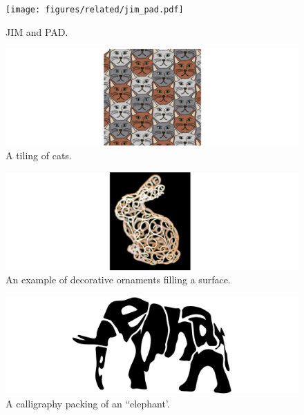 \begin{figure}[t]
\centering
\texttt{[image: figures/related/jim\_pad.pdf]} 
\caption[Examples of packings generated by JIM and PAD]
{\label{fig_related_jim_pad} 
JIM and PAD. }
\end{figure}

\begin{figure}[t]
\centering
\includegraphics[width=1.0\textwidth]{figures/related/escherization.pdf} 
\caption[An example of a tiling]
{\label{fig_related_escherization} 
A tiling of cats. }
\end{figure}

\begin{figure}[t]
\centering
\includegraphics[width=1.0\textwidth]{figures/related/zehnder.pdf} 
\caption[An example of decorative ornaments filling a surface]
{\label{fig_related_zehnder} 
An example of decorative ornaments filling a surface.}
\end{figure}

\begin{figure}[t!]
\centering
\includegraphics[width=1.0\textwidth]{figures/related/calligraphy.pdf} 
\caption[A calligraphy packing of an ``elephant'']
{\label{fig_calligraphy} 
A calligraphy packing of an ``elephant'.}
\end{figure}


